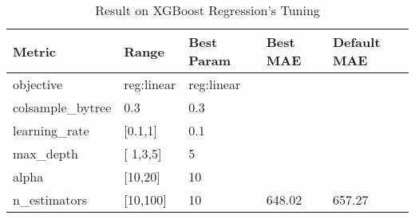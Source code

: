 \begin{table}[]
\begin{tabular}{|l|l|l|l|l|}
\hline
{\color[HTML]{000000} \textbf{Metric}}   & {\color[HTML]{000000} \textbf{Range}} & {\color[HTML]{000000} \textbf{Best Param}} & {\color[HTML]{000000} \textbf{Best MAE}}        & {\color[HTML]{000000} \textbf{Default MAE}}     \\ \hline
{\color[HTML]{000000} objective}         & {\color[HTML]{000000} reg:linear}     & {\color[HTML]{000000} reg:linear}          & {\color[HTML]{000000} }                         & {\color[HTML]{000000} }                         \\ \cline{1-3}
{\color[HTML]{000000} colsample\_bytree} & {\color[HTML]{000000} 0.3}            & {\color[HTML]{000000} 0.3}                 & {\color[HTML]{000000} }                         & {\color[HTML]{000000} }                         \\ \cline{1-3}
{\color[HTML]{000000} learning\_rate}    & {\color[HTML]{000000} {[}0.1,1{]}}    & {\color[HTML]{000000} 0.1}                 & {\color[HTML]{000000} }                         & {\color[HTML]{000000} }                         \\ \cline{1-3}
{\color[HTML]{000000} max\_depth}        & {\color[HTML]{000000} {[} 1,3,5{]}}   & {\color[HTML]{000000} 5}                   & {\color[HTML]{000000} }                         & {\color[HTML]{000000} }                         \\ \cline{1-3}
{\color[HTML]{000000} alpha}             & {\color[HTML]{000000} {[}10,20{]}}    & {\color[HTML]{000000} 10}                  & {\color[HTML]{000000} }                         & {\color[HTML]{000000} }                         \\ \cline{1-3}
{\color[HTML]{000000} n\_estimators}     & {\color[HTML]{000000} {[}10,100{]}}   & {\color[HTML]{000000} 10}                  & \multirow{-6}{*}{{\color[HTML]{000000} 648.02}} & \multirow{-6}{*}{{\color[HTML]{000000} 657.27}} \\ \hline
\end{tabular}
\label{tblRQ32}
\caption{Result on XGBoost Regression's Tuning}
\end{table}
